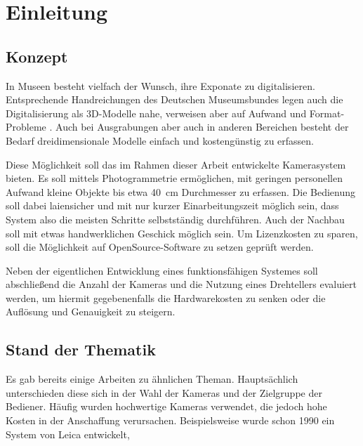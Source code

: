 \documentclass[./00PhotoBox.tex]{subfiles}
\begin{document}
\chapter{Einleitung}

\section{Konzept}

In Museen besteht vielfach der Wunsch, ihre Exponate zu digitalisieren. Entsprechende Handreichungen des Deutschen Museumsbundes legen auch die Digitalisierung als 3D-Modelle nahe, verweisen aber auf Aufwand und Format-Probleme \citep[S. 43]{handreichung_digital}.
Auch bei Ausgrabungen aber auch in anderen Bereichen besteht der Bedarf dreidimensionale Modelle einfach und kostengünstig zu erfassen.

Diese Möglichkeit soll das im Rahmen dieser Arbeit entwickelte Kamerasystem bieten. Es soll mittels Photogrammetrie ermöglichen, mit geringen personellen Aufwand kleine Objekte bis etwa 40~cm Durchmesser zu erfassen. Die Bedienung soll dabei laiensicher und mit nur kurzer Einarbeitungszeit möglich sein, dass System also die meisten Schritte selbstständig durchführen. Auch der Nachbau soll mit etwas handwerklichen Geschick möglich sein. Um Lizenzkosten zu sparen, soll die Möglichkeit auf OpenSource-Software zu setzen geprüft werden.

Neben der eigentlichen Entwicklung eines funktionsfähigen Systemes soll abschließend die Anzahl der Kameras und die Nutzung eines Drehtellers evaluiert werden, um hiermit gegebenenfalls die Hardwarekosten zu senken oder die Auflösung und Genauigkeit zu steigern.


\section{Stand der Thematik}

Es gab bereits einige Arbeiten zu ähnlichen Theman. Hauptsächlich unterschieden diese sich in der Wahl der Kameras und der Zielgruppe der Bediener. Häufig wurden hochwertige Kameras verwendet, die jedoch hohe Kosten in der Anschaffung verursachen. Beispielsweise wurde schon 1990 ein System von Leica entwickelt,



\biblio
\end{document}
